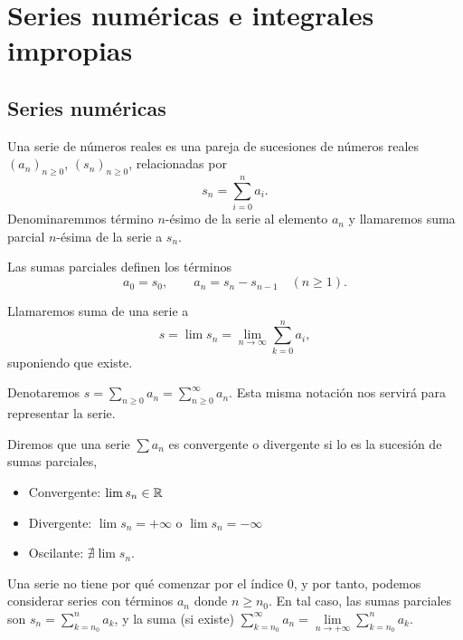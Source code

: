 \chapter{Series numéricas e integrales impropias}

\section{Series numéricas}

\begin{defi}
    Una serie de números reales es una pareja de sucesiones de números reales
    $(a_n)_{n \geq 0}$, $(s_n)_{n \geq 0}$, relacionadas por
    \[
        s_n = \sum_{i=0}^{n} a_i.
    \]
    Denominaremmos término $n$-ésimo de la serie al elemento $a_n$ y llamaremos
    suma parcial $n$-ésima de la serie a $s_n$.
\end{defi}
\begin{obs}
    Las sumas parciales definen los términos
    \[
        a_0 = s_0, \qquad a_n = s_n - s_{n-1} \quad (n \geq 1).
    \]
\end{obs}

\begin{defi}
    Llamaremos suma de una serie a
    \[
        s = \lim s_n = \lim\limits_{n \to \infty} \sum_{k=0}^{n} a_i,
    \]
    suponiendo que existe.
\end{defi}
\begin{obs}
    Denotaremos $s = \sum\limits_{n \geq 0} a_n = \sum\limits_{n \geq 0}^{\infty} a_n$.
    Esta misma notación nos servirá para representar la serie.
\end{obs}

\begin{defi}
    Diremos que una serie $\sum a_n$ es convergente o divergente si lo es la
    sucesión de sumas parciales,
    \begin{itemize}
        \item Convergente: $\lim s_n \in \mathbb{R}$
        \item Divergente: $\lim s_n = + \infty$ o $\lim s_n = - \infty$
        \item Oscilante: $\nexists \lim s_n$.
    \end{itemize}
\end{defi}

\begin{obs}
    Una serie no tiene por qué comenzar por el índice 0, y por tanto, podemos considerar
    series con términos $a_n$ donde $n \geq n_0$. En tal caso, las sumas parciales son
    $s_n = \sum\limits_{k=n_0}^n a_k$, y la suma (si existe) $\sum\limits_{k=n_0}^{\infty}
    a_n = \lim\limits_{n \to +\infty} \sum\limits_{k=n_0}^n a_k$.
\end{obs}


